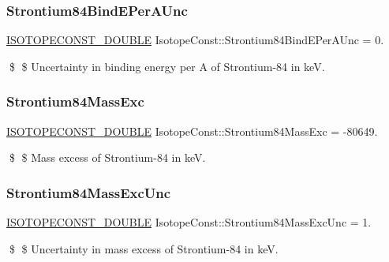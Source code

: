 \subsubsection{\texorpdfstring{Strontium84\+Bind\+E\+Per\+A\+Unc}{Strontium84BindEPerAUnc}}
{\footnotesize\ttfamily \mbox{\hyperlink{group___isotope_const-_macros_ga8f45a7272ce02c0b4c65c44636ed719a}{I\+S\+O\+T\+O\+P\+E\+C\+O\+N\+S\+T\+\_\+\+D\+O\+U\+B\+LE}} Isotope\+Const\+::\+Strontium84\+Bind\+E\+Per\+A\+Unc = 0.}

\$ \$ Uncertainty in binding energy per A of Strontium-\/84 in keV. \mbox{\label{group___isotope_const-_strontium-_sr84_ga4ac61ea655e15ea31c2c7bcb04f6d2d4}} 
\subsubsection{\texorpdfstring{Strontium84\+Mass\+Exc}{Strontium84MassExc}}
{\footnotesize\ttfamily \mbox{\hyperlink{group___isotope_const-_macros_ga8f45a7272ce02c0b4c65c44636ed719a}{I\+S\+O\+T\+O\+P\+E\+C\+O\+N\+S\+T\+\_\+\+D\+O\+U\+B\+LE}} Isotope\+Const\+::\+Strontium84\+Mass\+Exc = -\/80649.}

\$ \$ Mass excess of Strontium-\/84 in keV. \mbox{\label{group___isotope_const-_strontium-_sr84_ga99168739a88a7e507a64881b36a3b2a9}} 
\subsubsection{\texorpdfstring{Strontium84\+Mass\+Exc\+Unc}{Strontium84MassExcUnc}}
{\footnotesize\ttfamily \mbox{\hyperlink{group___isotope_const-_macros_ga8f45a7272ce02c0b4c65c44636ed719a}{I\+S\+O\+T\+O\+P\+E\+C\+O\+N\+S\+T\+\_\+\+D\+O\+U\+B\+LE}} Isotope\+Const\+::\+Strontium84\+Mass\+Exc\+Unc = 1.}

\$ \$ Uncertainty in mass excess of Strontium-\/84 in keV. \mbox{\label{group___isotope_const-_strontium-_sr84_gaf126d1c5b8a812a014f739f09cc10f59}} 
